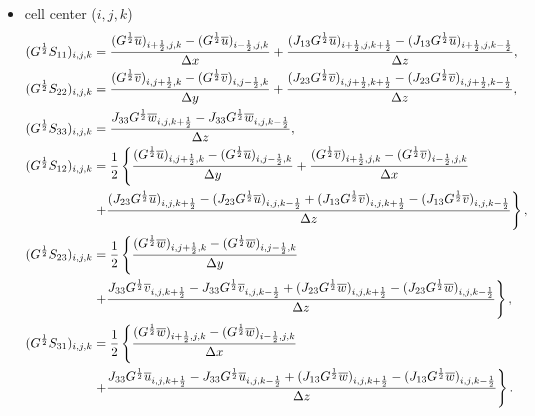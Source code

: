 \begin{itemize}
  \item cell center ($i,j,k$)
    \begin{align}
      (G^{\frac{1}{2}}S_{11})_{i,j,k} &=
      \frac{(G^{\frac{1}{2}}\overline{u})_{i+\frac{1}{2},j,k}-(G^{\frac{1}{2}}\overline{u})_{i-\frac{1}{2},j,k}}{\Delta x}
     +\frac{(J_{13}G^{\frac{1}{2}}\overline{u})_{i+\frac{1}{2},j,k+\frac{1}{2}}-(J_{13}G^{\frac{1}{2}}\overline{u})_{i+\frac{1}{2},j,k-\frac{1}{2}}}{\Delta z}, \\
     (G^{\frac{1}{2}}S_{22})_{i,j,k} &=
      \frac{(G^{\frac{1}{2}}\overline{v})_{i,j+\frac{1}{2},k}-(G^{\frac{1}{2}}\overline{v})_{i,j-\frac{1}{2},k}}{\Delta y}
     +\frac{(J_{23}G^{\frac{1}{2}}\overline{v})_{i,j+\frac{1}{2},k+\frac{1}{2}}-(J_{23}G^{\frac{1}{2}}\overline{v})_{i,j+\frac{1}{2},k-\frac{1}{2}}}{\Delta z}, \\
     (G^{\frac{1}{2}}S_{33})_{i,j,k} &=
      \frac{J_{33}G^{\frac{1}{2}}\overline{w}_{i,j,k+\frac{1}{2}}-J_{33}G^{\frac{1}{2}}\overline{w}_{i,j,k-\frac{1}{2}}}{\Delta z}, \\
      (G^{\frac{1}{2}}S_{12})_{i,j,k} &= \frac{1}{2}\left\{
      \frac{(G^{\frac{1}{2}}\overline{u})_{i,j+\frac{1}{2},k}-(G^{\frac{1}{2}}\overline{u})_{i,j-\frac{1}{2},k}}{\Delta y}
     +\frac{(G^{\frac{1}{2}}\overline{v})_{i+\frac{1}{2},j,k}-(G^{\frac{1}{2}}\overline{v})_{i-\frac{1}{2},j,k}}{\Delta x}  \right.\nonumber \\ &\left.
     +\frac{(J_{23}G^{\frac{1}{2}}\overline{u})_{i,j,k+\frac{1}{2}}-(J_{23}G^{\frac{1}{2}}\overline{u})_{i,j,k-\frac{1}{2}} + (J_{13}G^{\frac{1}{2}}\overline{v})_{i,j,k+\frac{1}{2}}-(J_{13}G^{\frac{1}{2}}\overline{v})_{i,j,k-\frac{1}{2}}}{\Delta z}
      \right\}, \\
      (G^{\frac{1}{2}}S_{23})_{i,j,k} &= \frac{1}{2}\left\{
      \frac{(G^{\frac{1}{2}}\overline{w})_{i,j+\frac{1}{2},k}-(G^{\frac{1}{2}}\overline{w})_{i,j-\frac{1}{2},k}}{\Delta y} \right. \nonumber \\ & \left.
      + \frac{J_{33}G^{\frac{1}{2}}\overline{v}_{i,j,k+\frac{1}{2}}-J_{33}G^{\frac{1}{2}}\overline{v}_{i,j,k-\frac{1}{2}} + (J_{23}G^{\frac{1}{2}}\overline{w})_{i,j,k+\frac{1}{2}}-(J_{23}G^{\frac{1}{2}}\overline{w})_{i,j,k-\frac{1}{2}}}{\Delta z}
      \right\}, \\
      (G^{\frac{1}{2}}S_{31})_{i,j,k} &= \frac{1}{2}\left\{
      \frac{(G^{\frac{1}{2}}\overline{w})_{i+\frac{1}{2},j,k}-(G^{\frac{1}{2}}\overline{w})_{i-\frac{1}{2},j,k}}{\Delta x} \right. \nonumber \\ & \left.
     +\frac{J_{33}G^{\frac{1}{2}}\overline{u}_{i,j,k+\frac{1}{2}}-J_{33}G^{\frac{1}{2}}\overline{u}_{i,j,k-\frac{1}{2}} + (J_{13}G^{\frac{1}{2}}\overline{w})_{i,j,k+\frac{1}{2}}-(J_{13}G^{\frac{1}{2}}\overline{w})_{i,j,k-\frac{1}{2}}}{\Delta z}
      \right\}.
    \end{align}


\end{itemize}
